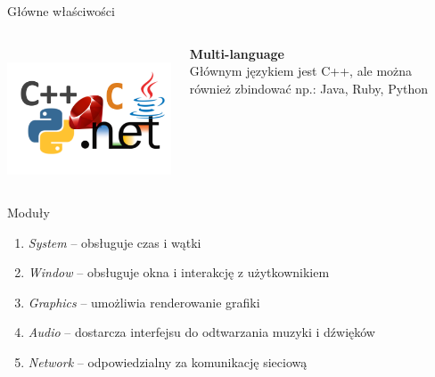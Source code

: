 \documentclass[12pt]{beamer}
\begin{document}
\begin{frame}[t]{Główne właściwości}
\begin{columns}
             \\[28pt]
            \includegraphics[scale=0.3]{textures/multilanguage.png} \\[20pt]
            \begin{center}
                \textbf{Multi-language} \\
                Głównym językiem jest C++, ale można również zbindować np.: Java, Ruby, Python
            \end{center}

        \end{columns}

    \end{frame}



    \begin{frame}[t]{Moduły}\vspace{40pt}

        \begin{enumerate}
            \item \textit{System} – obsługuje czas i wątki
            \item \textit{Window} – obsługuje okna i interakcję z użytkownikiem
            \item \textit{Graphics} – umożliwia renderowanie grafiki
            \item \textit{Audio} – dostarcza interfejsu do odtwarzania muzyki i dźwięków
            \item \textit{Network} – odpowiedzialny za komunikację sieciową
        \end{enumerate}

    \end{frame}
\end{document}
